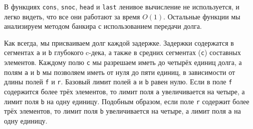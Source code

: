 В функциях \lstinline!cons!, \lstinline!snoc!, \lstinline!head! и
\lstinline!last! ленивое вычисление не используется, и легко видеть,
что все они работают за время $O(1)$. Остальные функции мы анализируем
методом банкира с использованием передачи долга.

Как всегда, мы присваиваем долг каждой задержке. Задержки содержатся в
сегментах \lstinline!a! и \lstinline!b! глубокого c-дека, а также в
средних сегментах (\lstinline!c!) составных элементов. Каждому полю
\lstinline!c! мы разрешаем иметь до четырёх единиц долга, а полям
\lstinline!a! и \lstinline!b! мы позволяем иметь от нуля до пяти
единиц, в зависимости от длины полей \lstinline!f! и
\lstinline!r!. Базовый лимит полей \lstinline!a! и \lstinline!b! равен
нулю. Если в поле \lstinline!f! содержится более трёх элементов, то
лимит поля \lstinline!a! увеличивается на четыре, а лимит поля
\lstinline!b! на одну единицу. Подобным образом, если поле
\lstinline!r! содержит более трёх элементов, то лимит поля
\lstinline!b! увеличивается на четыре, а лимит поля \lstinline!a! на
одну единицу.


